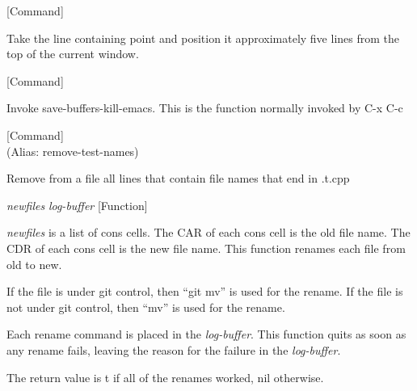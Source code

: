 \vspace{1em}
\noindent
{}
\usebox{\funcname}
 \hfill [Command]

\begin{doc-string}
Take the line containing point and position it approximately five lines
from the top of the current window.
\end{doc-string}

\vspace{1em}
\noindent
{}
\usebox{\funcname}
 \hfill [Command]

\begin{doc-string}
Invoke save-buffers-kill-emacs.  This is the function normally
invoked by C-x C-c
\end{doc-string}

\vspace{1em}
\noindent
{}
\usebox{\funcname}
 \hfill [Command]\\%
 (Alias: remove-test-names)

\begin{doc-string}
Remove from a file all lines that contain file names that end in .t.cpp
\end{doc-string}

\vspace{1em}
\noindent
{}
\usebox{\funcname}\emph{newfiles} \emph{log-buffer}
 \hfill [Function]

\begin{doc-string}
\emph{newfiles} is a list of cons cells.  The CAR of each cons cell is the old file
name.  The CDR of each cons cell is the new file name.  This function renames
each file from old to new.

If the file is under git control, then ``git mv'' is used for the rename.  If
the file is not under git control, then ``mv'' is used for the rename.

Each rename command is placed in the \emph{log-buffer}.  This function quits as soon as
any rename fails, leaving the reason for the failure in the \emph{log-buffer}.

The return value is t if all of the renames worked, nil otherwise.
\end{doc-string}

